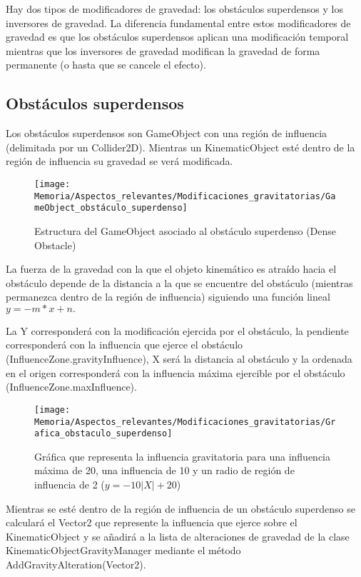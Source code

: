 Hay dos tipos de modificadores de gravedad: los obstáculos superdensos y los inversores de gravedad. La diferencia fundamental entre estos modificadores de gravedad es que los obstáculos superdensos aplican una modificación temporal mientras que los inversores de gravedad modifican la gravedad de forma permanente (o hasta que se cancele el efecto).

\subsection{Obstáculos superdensos}
Los obstáculos superdensos son GameObject con una región de influencia (delimitada por un Collider2D). Mientras un KinematicObject esté dentro de la región de influencia su gravedad se verá modificada.

\begin{figure}[h]
\centering
\texttt{[image: Memoria/Aspectos\_relevantes/Modificaciones\_gravitatorias/GameObject\_obstáculo\_superdenso]}
\caption{Estructura del GameObject asociado al obstáculo superdenso (Dense Obstacle)}
\end{figure}

La fuerza de la gravedad con la que el objeto kinemático es atraído hacia el obstáculo depende de la distancia a la que se encuentre del obstáculo (mientras permanezca dentro de la región de influencia) siguiendo una función lineal $y=-m*x+n.$

La Y corresponderá con la modificación ejercida por el obstáculo, la pendiente corresponderá con la influencia que ejerce el obstáculo (InfluenceZone.gravityInfluence), X será la distancia al obstáculo y la ordenada en el origen corresponderá con la influencia máxima ejercible por el obstáculo (InfluenceZone.maxInfluence).

\begin{figure}[h]
\centering
\texttt{[image: Memoria/Aspectos\_relevantes/Modificaciones\_gravitatorias/Grafica\_obstaculo\_superdenso]}
\caption{Gráfica que representa la influencia gravitatoria para una influencia máxima de 20, una influencia de 10 y un radio de región de influencia de 2 ($y = -10|X| + 20$)}
\end{figure}
\clearpage

Mientras se esté dentro de la región de influencia de un obstáculo superdenso se calculará el Vector2 que represente la influencia que ejerce sobre el KinematicObject y se añadirá a la lista de alteraciones de gravedad de la clase KinematicObjectGravityManager mediante el método AddGravityAlteration(Vector2).

